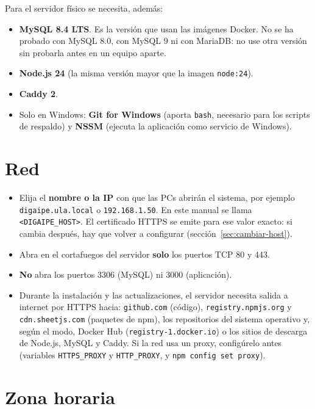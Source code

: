 Para el servidor físico se necesita, además:

\begin{itemize}
	\item \textbf{MySQL 8.4 LTS}. Es la versión que usan las imágenes Docker. No se ha probado con
	      MySQL 8.0, con MySQL 9 ni con MariaDB: no use otra versión sin probarla antes en un equipo
	      aparte.
	\item \textbf{Node.js 24} (la misma versión mayor que la imagen \texttt{node:24}).
	\item \textbf{Caddy 2}.
	\item Solo en Windows: \textbf{Git for Windows} (aporta \texttt{bash}, necesario para los
	      scripts de respaldo) y \textbf{NSSM} (ejecuta la aplicación como servicio de Windows).
\end{itemize}

\section{Red}

\begin{itemize}
	\item Elija el \textbf{nombre o la IP} con que las PCs abrirán el sistema, por ejemplo
	      \texttt{digaipe.ula.local} o \texttt{192.168.1.50}. En este manual se llama
	      \texttt{<DIGAIPE\_HOST>}. El certificado HTTPS se emite para ese valor exacto: si cambia
	      después, hay que volver a configurar (sección~\ref{sec:cambiar-host}).
	\item Abra en el cortafuegos del servidor \textbf{solo} los puertos TCP 80 y 443.
	\item \textbf{No} abra los puertos 3306 (MySQL) ni 3000 (aplicación).
	\item Durante la instalación y las actualizaciones, el servidor necesita salida a internet
	      por HTTPS hacia: \texttt{github.com} (código), \texttt{registry.npmjs.org} y
	      \texttt{cdn.sheetjs.com} (paquetes de npm), los repositorios del sistema operativo y, según
	      el modo, Docker Hub (\texttt{registry-1.docker.io}) o los sitios de descarga de Node.js,
	      MySQL y Caddy. Si la red usa un proxy, configúrelo antes (variables
	      \texttt{HTTPS\_PROXY} y \texttt{HTTP\_PROXY}, y \texttt{npm config set proxy}).
\end{itemize}

\section{Zona horaria}

